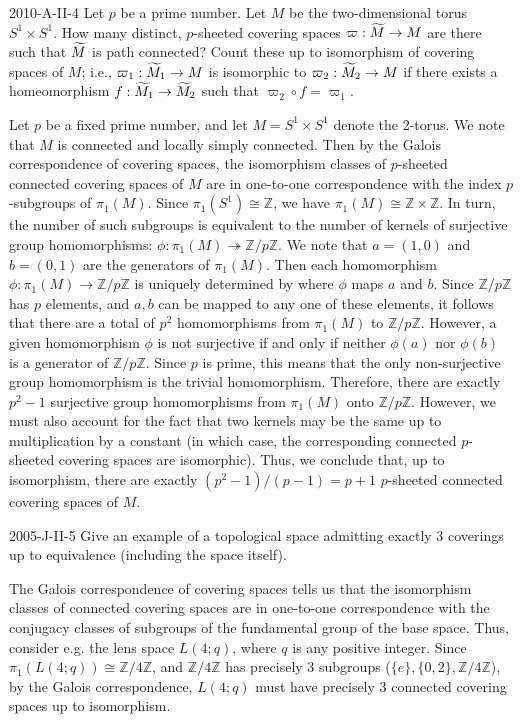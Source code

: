\documentclass{article}
\begin{document}
	\begin{prb}{2010-A-II-4}
		Let $p$ be a prime number. Let $M$ be the two-dimensional torus $S^{1} \times S^{1}$. How many distinct, $p$-sheeted covering spaces $\varpi: \widetilde{M} \to M$ are there such that $\widetilde{M}$ is path connected? Count these up to isomorphism of covering spaces of $M$; i.e., $\varpi_{1}: \widetilde{M}_{1} \to M$ is isomorphic to $\varpi_{2}: \widetilde{M}_{2} \to M$ if there exists a homeomorphism $f: \widetilde{M}_{1}  \to \widetilde{M}_{2}$ such that $\varpi_{2} \circ f = \varpi_{1}$. 
	\end{prb}
	Let $p$ be a fixed prime number, and let $M = S^{1} \times S^{1}$ denote the 2-torus. We note that $M$ is connected and locally simply connected. Then by the Galois correspondence of covering spaces, the isomorphism classes of $p$-sheeted connected covering spaces of $M$ are in one-to-one correspondence with the index $p$-subgroups of $\pi_{1}(M)$. Since $\pi_{1}(S^{1}) \cong \mathbb{Z}$, we have $\pi_{1}(M) \cong \mathbb{Z} \times \mathbb{Z}$. In turn, the number of such subgroups is equivalent to the number of kernels of surjective group homomorphisms: $\phi: \pi_{1}(M) \twoheadrightarrow \mathbb{Z}/p\mathbb{Z}$. We note that $a = (1,0)$ and $b = (0,1)$ are the generators of $\pi_{1}(M)$. Then each homomorphism $\phi: \pi_{1}(M) \to \mathbb{Z}/p\mathbb{Z}$ is uniquely determined by where $\phi$ maps $a$ and $b$. Since $\mathbb{Z}/p\mathbb{Z}$ has $p$ elements, and $a, b$ can be mapped to any one of these elements, it follows that there are a total of $p^{2}$ homomorphisms from $\pi_{1}(M)$ to $\mathbb{Z}/p\mathbb{Z}$. However, a given homomorphism $\phi$ is not surjective if and only if neither $\phi(a)$ nor $\phi(b)$ is a generator of $\mathbb{Z}/p\mathbb{Z}$. Since $p$ is prime, this means that the only non-surjective group homomorphism is the trivial homomorphism. Therefore, there are exactly $p^{2} - 1$ surjective group homomorphisms from $\pi_{1}(M)$ onto $\mathbb{Z}/p\mathbb{Z}$. However, we must also account for the fact that two kernels may be the same up to multiplication by a constant (in which case, the corresponding connected $p$-sheeted covering spaces are isomorphic). Thus, we conclude that, up to isomorphism, there are exactly $(p^{2} - 1)/(p - 1) = p + 1$ $p$-sheeted connected covering spaces of $M$.
	
	\begin{prb}{2005-J-II-5}
		Give an example of a topological space admitting exactly 3 coverings up to equivalence (including the space itself). 
	\end{prb}
	The Galois correspondence of covering spaces tells us that the isomorphism classes of connected covering spaces are in one-to-one correspondence with the conjugacy classes of subgroups of the fundamental group of the base space. Thus, consider e.g. the lens space $L(4;q)$, where $q$ is any positive integer. Since $\pi_1(L(4;q)) \cong \mathbb{Z}/4\mathbb{Z}$, and $\mathbb{Z}/4\mathbb{Z}$ has precisely 3 subgroups ($\{e\}, \{0,2\}, \mathbb{Z}/4\mathbb{Z}$), by the Galois correspondence, $L(4;q)$ must have precisely 3 connected covering spaces up to isomorphism. 
	
\end{document}
